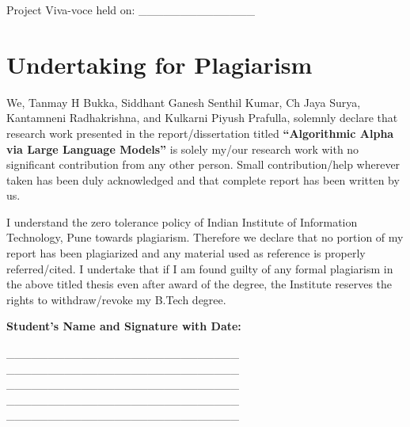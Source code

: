 \documentclass[12pt, a4paper]{report}
\begin{document}
\vspace{3cm}

\noindent Project Viva-voce held on: \_\_\_\_\_\_\_\_\_\_\_\_\_\_

\newpage
\chapter*{Undertaking for Plagiarism}

We, Tanmay H Bukka, Siddhant Ganesh Senthil Kumar, Ch Jaya Surya, Kantamneni Radhakrishna, and Kulkarni Piyush Prafulla, solemnly declare that research work presented in the report/dissertation titled \textbf{“Algorithmic Alpha via Large Language Models”} is solely my/our research work with no significant contribution from any other person. Small contribution/help wherever taken has been duly acknowledged and that complete report has been written by us. 

I understand the zero tolerance policy of Indian Institute of Information Technology, Pune towards plagiarism. Therefore we declare that no portion of my report has been plagiarized and any material used as reference is properly referred/cited. I undertake that if I am found guilty of any formal plagiarism in the above titled thesis even after award of the degree, the Institute reserves the rights to withdraw/revoke my B.Tech degree.

\vspace{2cm}

\noindent \textbf{Student’s Name and Signature with Date:}

\vspace{1cm}
\noindent \_\_\_\_\_\_\_\_\_\_\_\_\_\_\_\_\_\_\_\_\_\_\_\_\_\_\_\_  \\

\noindent  \_\_\_\_\_\_\_\_\_\_\_\_\_\_\_\_\_\_\_\_\_\_\_\_\_\_\_\_  \\

\noindent  \_\_\_\_\_\_\_\_\_\_\_\_\_\_\_\_\_\_\_\_\_\_\_\_\_\_\_\_  \\

\noindent \_\_\_\_\_\_\_\_\_\_\_\_\_\_\_\_\_\_\_\_\_\_\_\_\_\_\_\_  \\

\noindent \_\_\_\_\_\_\_\_\_\_\_\_\_\_\_\_\_\_\_\_\_\_\_\_\_\_\_\_  \\
\end{document}

